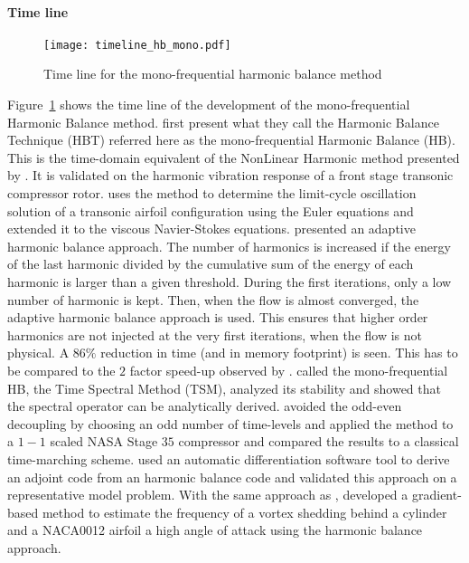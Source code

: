 \paragraph{Time line}
\begin{figure}[htbp]
  \centering
  \texttt{[image: timeline\_hb\_mono.pdf]}
  \caption{Time line for the mono-frequential harmonic balance method}
  \label{fig:timeline_hb_mono}
\end{figure}
Figure~\ref{fig:timeline_hb_mono} shows the time line of the
development of the mono-frequential Harmonic Balance method.
\citet{Hall2002} first present what they call
the Harmonic Balance Technique (HBT) referred here
as the mono-frequential Harmonic Balance (HB). This is 
the time-domain equivalent of the NonLinear Harmonic method
presented by \citet{He1998}. It is validated on 
the harmonic vibration response of a front 
stage transonic compressor rotor.
\citet{Thomas2002a} uses the method to
determine the limit-cycle oscillation solution
of a transonic airfoil configuration using the
Euler equations and \citet{Thomas2004b} extended
it to the viscous Navier-Stokes equations.
\citet{Maple2004} presented an adaptive harmonic
balance approach. The number of harmonics is increased
if the energy of the last harmonic divided by the cumulative
sum of the energy of each harmonic is larger than a 
given threshold. During the first iterations, only
a low number of harmonic is kept. Then, when the flow
is almost converged, the adaptive harmonic balance
approach is used. This ensures that higher order harmonics
are not injected at the very first iterations, when the
flow is not physical. A $86\%$ reduction in time (and
in memory footprint) is seen. This has to be compared to
the $2$ factor speed-up observed by \citet{Mosahebi2013}.
\citet{Gopinath2005} called the mono-frequential HB,
the Time Spectral Method (TSM), analyzed its stability and
showed that the spectral operator can be analytically derived.
\citet{Weide2005} avoided the odd-even decoupling by choosing 
an odd number of time-levels
and applied the method to a $1-1$ scaled NASA Stage $35$ compressor 
and
compared the results to a classical time-marching scheme.
\citet{Thomas2005b} used an automatic 
differentiation software tool to derive an adjoint code
from an harmonic balance code and validated this approach
on a representative model problem.
With the same approach as \citet{McMullen2002}, \citet{Gopinath2006}
developed a gradient-based method to estimate the frequency of a 
vortex shedding behind a cylinder and a NACA0012 airfoil 
a high angle of attack using the harmonic balance approach.
